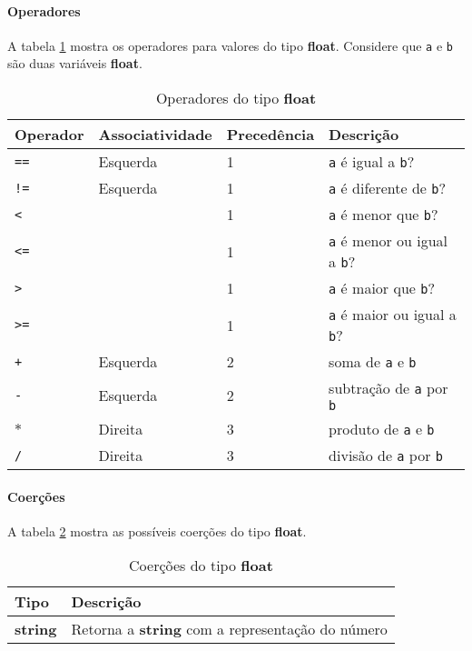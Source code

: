\paragraph{Operadores} A tabela \ref{tab:operadores-float} mostra os operadores para valores do tipo \textbf{float}. Considere que \texttt{a} e \texttt{b} são duas variáveis \textbf{float}.
\begin{table}[!h]
    \begin{tabular}{@{}llll@{}}
        \toprule
        Operador                 & Associatividade & Precedência & Descrição                                 \\ \midrule
        \texttt{==}              & Esquerda        & 1           & \texttt{a} é igual a \texttt{b}?          \\
        \texttt{!=}              & Esquerda        & 1           & \texttt{a} é diferente de \texttt{b}?     \\
        \texttt{\textless{}}     &                 & 1           & \texttt{a} é menor que \texttt{b}?        \\
        \texttt{\textless{}=}    &                 & 1           & \texttt{a} é menor ou igual a \texttt{b}? \\
        \texttt{\textgreater{}}  &                 & 1           & \texttt{a} é maior que \texttt{b}?        \\
        \texttt{\textgreater{}=} &                 & 1           & \texttt{a} é maior ou igual a \texttt{b}? \\
        \texttt{+}               & Esquerda        & 2           & soma de \texttt{a} e \texttt{b}           \\
        \texttt{-}               & Esquerda        & 2           & subtração de \texttt{a} por \texttt{b}    \\
        \texttt{$*$}             & Direita         & 3           & produto de \texttt{a} e \texttt{b}        \\
        \texttt{/}               & Direita         & 3           & divisão de \texttt{a} por \texttt{b}      \\
    \end{tabular}
    \caption{Operadores do tipo \textbf{float}}
    \label{tab:operadores-float}
\end{table}

\paragraph{Coerções} A tabela \ref{tab:coercoes-float} mostra as possíveis coerções do tipo \textbf{float}.
\begin{table}[!h]
    \begin{tabular}{@{}ll@{}}
        \toprule
        Tipo            & Descrição                                               \\ \midrule
        \textbf{string} & Retorna a \textbf{string} com a representação do número \\ \bottomrule
    \end{tabular}
    \caption{Coerções do tipo \textbf{float}}
    \label{tab:coercoes-float}
\end{table}

